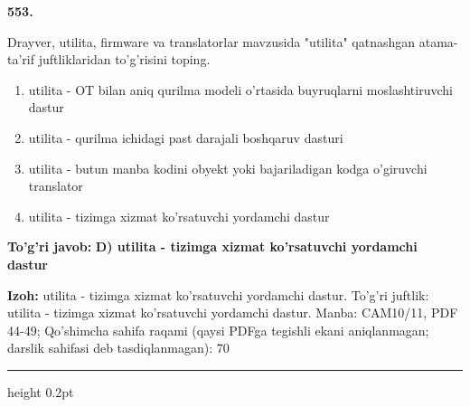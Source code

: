 \documentclass[10pt,a4paper]{article}
\begin{document}
{\bfseries\sffamily\color{ink} 553.}
\par
Drayver, utilita, firmware va translatorlar mavzusida "utilita" qatnashgan atama-ta'rif juftliklaridan to'g'risini toping.
\begin{enumerate}[label=\Alph*),leftmargin=9mm]
\item utilita - OT bilan aniq qurilma modeli o'rtasida buyruqlarni moslashtiruvchi dastur
\item utilita - qurilma ichidagi past darajali boshqaruv dasturi
\item utilita - butun manba kodini obyekt yoki bajariladigan kodga o'giruvchi translator
\item utilita - tizimga xizmat ko'rsatuvchi yordamchi dastur
\end{enumerate}
\begin{tcolorbox}[enhanced,breakable,colback=teal!4,colframe=teal!60!black,boxrule=0.45pt,arc=1.2mm,left=2.7mm,right=2.7mm,top=1.8mm,bottom=1.8mm,before skip=2mm,after skip=2mm]
{\bfseries\sffamily\color{teal}To'g'ri javob:} \textbf{D) utilita - tizimga xizmat ko'rsatuvchi yordamchi dastur}
\par\smallskip
{\bfseries Izoh:} utilita - tizimga xizmat ko'rsatuvchi yordamchi dastur. To'g'ri juftlik: utilita - tizimga xizmat ko'rsatuvchi yordamchi dastur. Manba: CAM10/11, PDF 44-49; Qo'shimcha sahifa raqami (qaysi PDFga tegishli ekani aniqlanmagan; darslik sahifasi deb tasdiqlanmagan): 70
\end{tcolorbox}
\vspace{2mm}\hrule height 0.2pt\vspace{3mm}
\end{document}
